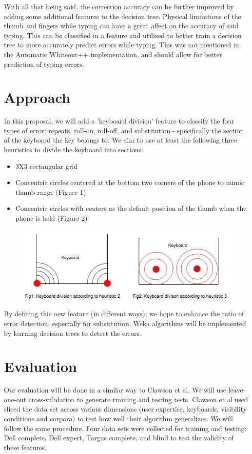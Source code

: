 \documentclass[letterpaper, 9 pt, conference]{ieeeconf}  %
\begin{document}
With all that being said, the correction accuracy can be further improved by adding some additional features to the decision tree.  Physical limitations of the thumb and fingers while typing can have a great affect on the accuracy of said typing.  This can be classified in a feature and utilized to better train a decision tree to more accurately predict errors while typing.  This was not mentioned in the Automatic Whiteout++ implementation, and should allow for better prediction of typing errors.

\section{Approach}
In this proposal, we will add a 'keyboard division' feature to classify the four types of error: repeats, roll-on, roll-off, and substitution - specifically the section of the keyboard the key belongs to. We aim to use at least the following three heuristics to divide the keyboard into sections:
\begin{itemize}
\item 3X3 rectangular grid
\item Concentric circles centered at the bottom two corners of the phone to mimic thumb range (Figure 1)
\item Concentric circles with centers as the default position of the thumb when the phone is held (Figure 2)
\end{itemize}

\begin{figure}
	\centering
	\includegraphics[scale=0.5]{heuristics}
\end{figure}

By defining this new feature (in different ways), we hope to enhance the ratio of error detection, especially for substitution. Weka algorithms will be implemented by learning decision trees to detect the errors.

\section{Evaluation}
Our evaluation will be done in a similar way to Clawson et al. We will use leave-one-out cross-validation to generate training and testing tests. Clawson et al used sliced the data set across various dimensions (user expertise, keyboards, visibility conditions and corpora) to test how well their algorithm generalizes. We will follow the same procedure.  Four data sets were collected for training and testing: Dell complete, Dell expert, Targus complete, and blind to test the validity of these features.
\end{document}

